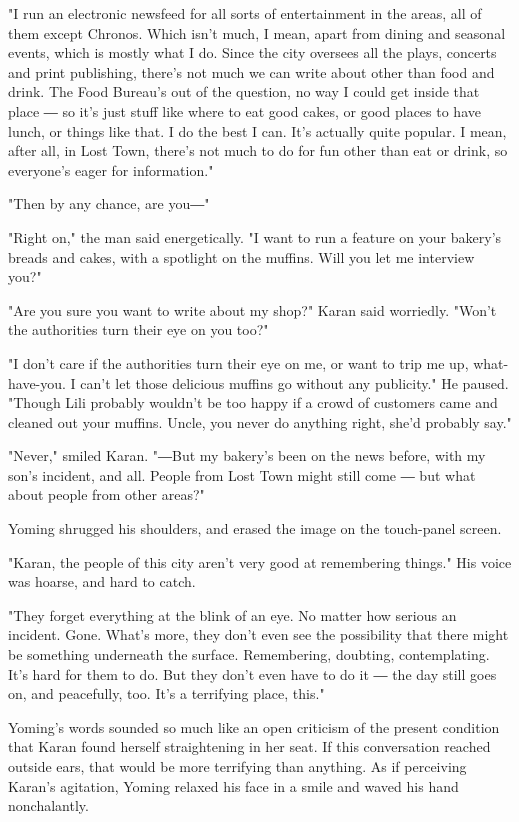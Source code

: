 "I run an electronic newsfeed for all sorts of entertainment in the
areas, all of them except Chronos. Which isn't much, I mean, apart from
dining and seasonal events, which is mostly what I do. Since the city
oversees all the plays, concerts and print publishing, there's not much
we can write about other than food and drink. The Food Bureau's out of
the question, no way I could get inside that place ― so it's just stuff
like where to eat good cakes, or good places to have lunch, or things
like that. I do the best I can. It's actually quite popular. I mean,
after all, in Lost Town, there's not much to do for fun other than eat
or drink, so everyone's eager for information."

"Then by any chance, are you―"

"Right on," the man said energetically. "I want to run a feature on your
bakery's breads and cakes, with a spotlight on the muffins. Will you let
me interview you?"

"Are you sure you want to write about my shop?" Karan said worriedly.
"Won't the authorities turn their eye on you too?"

"I don't care if the authorities turn their eye on me, or want to trip
me up, what-have-you. I can't let those delicious muffins go without any
publicity." He paused. "Though Lili probably wouldn't be too happy if a
crowd of customers came and cleaned out your muffins. Uncle, you never
do anything right, she'd probably say."

"Never," smiled Karan. "―But my bakery's been on the news before, with
my son's incident, and all. People from Lost Town might still come ― but
what about people from other areas?"

Yoming shrugged his shoulders, and erased the image on the touch-panel
screen.

"Karan, the people of this city aren't very good at remembering things."
His voice was hoarse, and hard to catch.

"They forget everything at the blink of an eye. No matter how serious an
incident. Gone. What's more, they don't even see the possibility that
there might be something underneath the surface. Remembering, doubting,
contemplating. It's hard for them to do. But they don't even have to do
it ― the day still goes on, and peacefully, too. It's a terrifying
place, this."

Yoming's words sounded so much like an open criticism of the present
condition that Karan found herself straightening in her seat. If this
conversation reached outside ears, that would be more terrifying than
anything. As if perceiving Karan's agitation, Yoming relaxed his face in
a smile and waved his hand nonchalantly.


